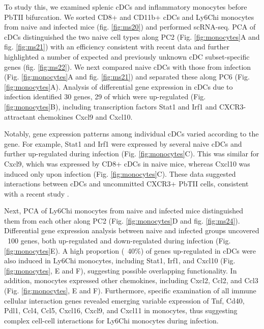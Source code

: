 To study this, we examined splenic cDCs and inflammatory monocytes before PbTII bifurcation. We sorted CD8+ and CD11b+ cDCs and Ly6Chi monocytes from naive and infected mice (fig. \ref{fig:ms20}) and performed scRNA-seq. PCA of cDCs distinguished the two naive cell types along PC2 (Fig. \ref{fig:monocytes}A and fig. \ref{fig:ms21}) with an efficiency consistent with recent data \cite{Jaitin2014-pk} and further highlighted a number of expected and previously unknown cDC subset-specific genes (fig. \ref{fig:ms22}). We next compared naive cDCs with those from infection (Fig. \ref{fig:monocytes}A and fig. \ref{fig:ms21}) and separated these along PC6 (Fig. \ref{fig:monocytes}A). Analysis of differential gene expression in cDCs due to infection identified 30 genes, 29 of which were up-regulated (Fig. \ref{fig:monocytes}B), including transcription factors Stat1 and Irf1 and CXCR3-attractant chemokines Cxcl9 and Cxcl10.

Notably, gene expression patterns among individual cDCs varied according to the gene. For example, Stat1 and Irf1 were expressed by several naive cDCs and further up-regulated during infection (Fig. \ref{fig:monocytes}C). This was similar for Cxcl9, which was expressed by CD8+ cDCs in naive mice, whereas Cxcl10 was induced only upon infection (Fig. \ref{fig:monocytes}C). These data suggested interactions between cDCs and uncommitted CXCR3+ PbTII cells, consistent with a recent study \cite{Groom2012-az}.

Next, PCA of Ly6Chi monocytes from naive and infected mice distinguished them from each other along PC2 (Fig. \ref{fig:monocytes}D and fig. \ref{fig:ms24}). Differential gene expression analysis between naive and infected groups uncovered ~100 genes, both up-regulated and down-regulated during infection (Fig. \ref{fig:monocytes}E). A high proportion (~40\%) of genes up-regulated in cDCs were also induced in Ly6Chi monocytes, including Stat1, Irf1, and Cxcl10 (Fig. \ref{fig:monocytes}, E and F), suggesting possible overlapping functionality. In addition, monocytes expressed other chemokines, including Cxcl2, Ccl2, and Ccl3 (Fig. \ref{fig:monocytes}, E and F). Furthermore, specific examination of all immune cellular interaction genes revealed emerging variable expression of Tnf, Cd40, Pdl1, Ccl4, Ccl5, Cxcl16, Cxcl9, and Cxcl11 in monocytes, thus suggesting complex cell-cell interactions for Ly6Chi monocytes during infection.

